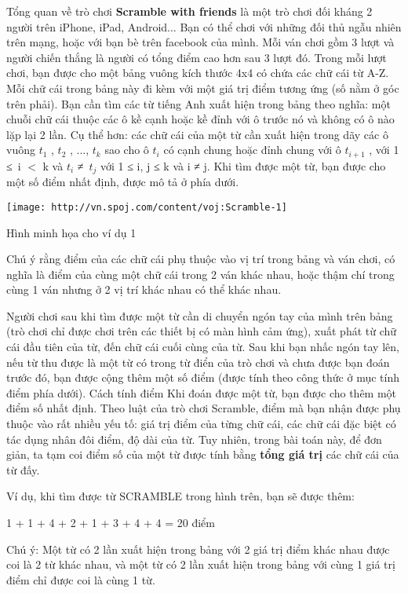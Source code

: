 Tổng quan về trò chơi
\textbf{Scramble with friends } là một trò chơi đối kháng 2 người trên iPhone, iPad, Android... Bạn có thể chơi với những đối thủ ngẫu nhiên trên mạng, hoặc với bạn bè trên facebook của mình. Mỗi ván chơi gồm 3 lượt và người chiến thắng là người có tổng điểm cao hơn sau 3 lượt đó. Trong mỗi lượt chơi, bạn được cho một bảng vuông kích thước 4x4 có chứa các chữ cái từ A-Z. Mỗi chữ cái trong bảng này đi kèm với một giá trị điểm tương ứng (số nằm ở góc trên phải). Bạn cần tìm các từ tiếng Anh xuất hiện trong bảng theo nghĩa: một chuỗi chữ cái thuộc các ô kề cạnh hoặc kề đỉnh với ô trước nó và không có ô nào lặp lại 2 lần. Cụ thể hơn: các chữ cái của một từ cần xuất hiện trong dãy các ô vuông $t_{1}$ , $t_{2}$ , ..., $t_{k}$ sao cho ô $t_{i}$ có cạnh chung hoặc đỉnh chung với ô $t_{i+1}$ , với 1 ≤ i $<$ k và $t_{i}$ ≠ $t_{j}$ với 1 ≤ i, j ≤ k và i ≠ j. Khi tìm được một từ, bạn được cho một số điểm nhất định, được mô tả ở phía dưới.


\texttt{[image: http://vn.spoj.com/content/voj:Scramble-1]}

Hình minh họa cho ví dụ 1

Chú ý rằng điểm của các chữ cái phụ thuộc vào vị trí trong bảng và ván chơi, có nghĩa là điểm của cùng một chữ cái trong 2 ván khác nhau, hoặc thậm chí trong cùng 1 ván nhưng ở 2 vị trí khác nhau có thể khác nhau.

Người chơi sau khi tìm được một từ cần di chuyển ngón tay của mình trên bảng (trò chơi chỉ được chơi trên các thiết bị có màn hình cảm ứng), xuất phát từ chữ cái đầu tiên của từ, đến chữ cái cuối cùng của từ. Sau khi bạn nhấc ngón tay lên, nếu từ thu được là một từ có trong từ điển của trò chơi và chưa được bạn đoán trước đó, bạn được cộng thêm một số điểm (được tính theo công thức ở mục tính điểm phía dưới).
Cách tính điểm
Khi đoán được một từ, bạn được cho thêm một điểm số nhất định. Theo luật của trò chơi Scramble, điểm mà bạn nhận được phụ thuộc vào rất nhiều yếu tố: giá trị điểm của từng chữ cái, các chữ cái đặc biệt có tác dụng nhân đôi điểm, độ dài của từ. Tuy nhiên, trong bài toán này, để đơn giản, ta tạm coi điểm số của một từ được tính bằng \textbf{ tổng giá trị } các chữ cái của từ đấy.

Ví dụ, khi tìm được từ SCRAMBLE trong hình trên, bạn sẽ được thêm:

1 + 1 + 4 + 2 + 1 + 3 + 4 + 4 = 20 điểm

Chú ý: Một từ có 2 lần xuất hiện trong bảng với 2 giá trị điểm khác nhau được coi là 2 từ khác nhau, và một từ có 2 lần xuất hiện trong bảng với cùng 1 giá trị điểm chỉ được coi là cùng 1 từ.

